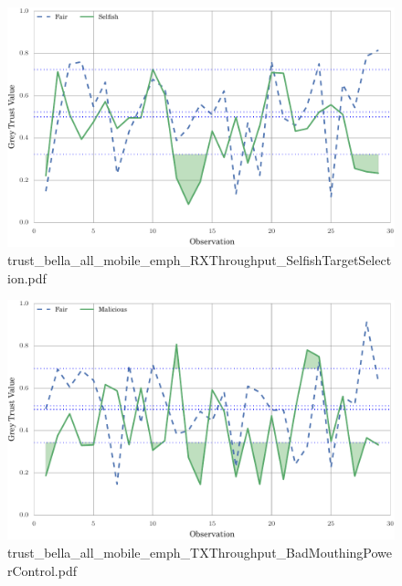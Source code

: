 \documentclass{article}
\begin{document}
\begin{figure}[h!]
\centering
\includegraphics[width=\linewidth]{trust_bella_all_mobile_emph_RXThroughput_SelfishTargetSelection.pdf}
\caption{trust\_bella\_all\_mobile\_emph\_RXThroughput\_SelfishTargetSelection.pdf}
\end{figure}




\begin{figure}[h!]
\centering
\includegraphics[width=\linewidth]{trust_bella_all_mobile_emph_TXThroughput_BadMouthingPowerControl.pdf}
\caption{trust\_bella\_all\_mobile\_emph\_TXThroughput\_BadMouthingPowerControl.pdf}
\end{figure}
\end{document}
